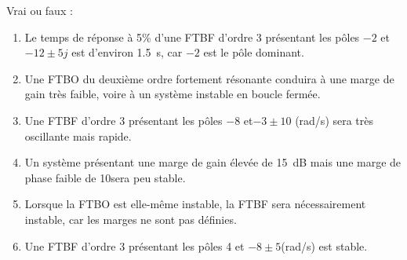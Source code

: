\documentclass[10pt,fleqn]{article} %
\begin{document}
\def\pathfig{images}

\vspace{4.5cm}
\pagestyle{fancy}
\thispagestyle{plain}

\def\columnseprulecolor{\color{ocre}}
\setlength{\columnseprule}{0.4pt} 

\def\pathfig{images}

\begin{multicols}{2}
\ifprof
\else
Vrai ou faux : 
\begin{enumerate}
\item Le temps de réponse à 5\% d’une FTBF d’ordre 3 présentant les pôles $-2$ et $-12\pm 5j$ est d’environ \SI{1,5}{s}, car $-2$ est le pôle dominant. %
\item Une FTBO du deuxième ordre fortement résonante conduira à une marge de gain très faible, voire à un système instable en boucle fermée. %
\item Une FTBF d’ordre 3 présentant les pôles $-8$ et$-3 \pm 10$ (rad/s) sera très oscillante mais rapide. %
\item  Un système présentant une marge de gain élevée de \SI{15}{dB} mais une marge de phase faible de 10\degres sera peu stable. %
\item Lorsque la FTBO est elle-même instable, la FTBF sera nécessairement instable, car les marges ne sont pas définies. %
\item Une FTBF d’ordre 3 présentant les pôles 4 et $-8\pm 5 $(rad/s) est stable. %
\end{enumerate}


\end{multicols}
\end{document}
